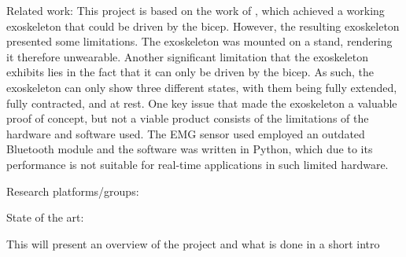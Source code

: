     Related work: %
        This project is based on the work of \cite{AFES}, which achieved a working exoskeleton that could be driven by the bicep. However, the resulting 
        exoskeleton presented some limitations. The exoskeleton was mounted on a stand, rendering it therefore unwearable. Another significant limitation 
        that the exoskeleton exhibits lies in the fact that it can only be driven by the bicep. As such, the exoskeleton can only show three different states, 
        with them being fully extended, fully contracted, and at rest. One key issue that made the exoskeleton a valuable proof of concept, but not a viable 
        product consists of the limitations of the hardware and software used. The EMG sensor used employed an outdated Bluetooth module and the software was 
        written in Python, which due to its performance is not suitable for real-time applications in such limited hardware.

    Research platforms/groups:

    State of the art:


    This will present an overview of the project and what is done in a short intro
